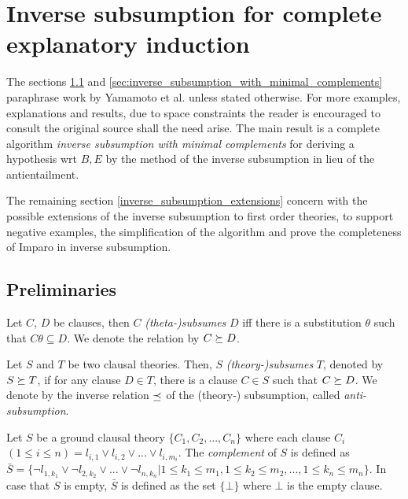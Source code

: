 \chapter{Inverse subsumption for complete explanatory induction\cite{yamamoto2012inverse}}
\label{inverse_subsumption_for_complete_explanatory_induction}
The sections \ref{sec:preliminaries} and \ref{sec:inverse_subsumption_with_minimal_complements} paraphrase work by Yamamoto et al. \cite{yamamoto2012inverse} unless stated otherwise. For more examples, explanations and results, due to space constraints the reader is encouraged to consult the original source shall the need arise. The main result is a complete algorithm \emph{inverse subsumption with minimal complements} for deriving a hypothesis wrt $B, E$ by the method of the inverse subsumption in lieu of the antientailment.

The remaining section \ref{inverse_subsumption_extensions} concern with the possible extensions of the inverse subsumption to first order theories, to support negative examples, the simplification of the algorithm and prove the completeness of Imparo in inverse subsumption.

\section{Preliminaries}\label{sec:preliminaries}
\begin{defn}
Let $C$, $D$ be clauses, then $C$ \emph{(theta-)subsumes} $D$ iff there is a substitution $\theta$ such that $C \theta \subseteq D$. We denote the relation by $C \succeq D$.
\end{defn}

\begin{defn}\label{definition_theory_subsumption}
Let $S$ and $T$ be two clausal theories. Then, $S$ \emph{(theory-)subsumes} $T$, denoted by $S \succeq T$, if for any clause $D \in T$, there is a clause $C \in S$ such
that $C \succeq D$. We denote by the inverse relation $\preceq$ of the (theory-) subsumption, called \emph{anti-subsumption}.
\end{defn}

\begin{defn}
Let $S$ be a ground clausal theory $\{C_1, C_2,... ,C_n\}$ where each clause $C_i$ $(1 \le i \le n)= l_{i,1} \lor l_{i,2} \lor... \lor l_{i,m_i}$.
The \emph{complement} of $S$ is defined as
\\$\bar{S} = \{\neg l_{1,k_1} \lor \neg l_{2,k_2} \lor... \lor \neg l_{n,k_n} |
1 \le k_1 \le m_1 , 1 \le k_2 \le m_2,..., 1 \le k_n \le m_n\}$.
In case that $S$ is empty, $\bar{S}$ is defined as the set $\{\bot\}$ where $\bot$ is the empty clause.
\end{defn}


